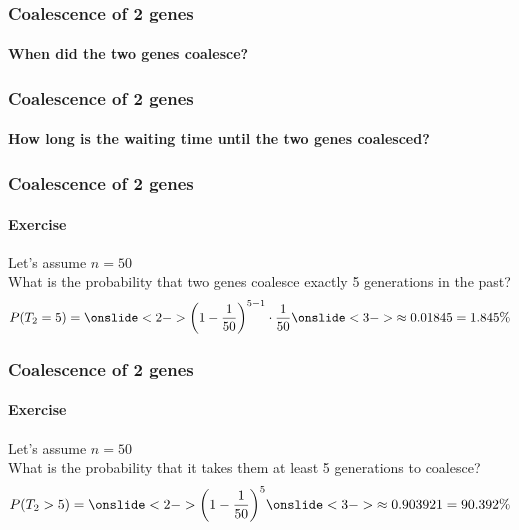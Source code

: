 \documentclass{beamer}
\begin{document}
        \begin{frame}
            \frametitle{Coalescence of 2 genes}
            \framesubtitle{When did the two genes coalesce? }
        \end{frame}

        \begin{frame}
            \frametitle{Coalescence of 2 genes}
            \framesubtitle{How long is the waiting time until the two genes coalesced?}
        \end{frame}

        \begin{frame}
            \frametitle{Coalescence of 2 genes}
            \framesubtitle{Exercise}
            Let's assume $n = 50$ \\
            What is the probability that two genes coalesce exactly 5 generations in the past? \\ 
                \[
                    P(T_{2} = 5) =
                    \onslide<2->{\left(1 - \frac{1}{50}\right)^{5-1} \cdot \frac{1}{50}}
                    \onslide<3->{\approx 0.01845 = 1.845\%}
                \]
        \end{frame}

        \begin{frame}
            \frametitle{Coalescence of 2 genes}
            \framesubtitle{Exercise}
            Let's assume $n = 50$ \\
            What is the probability that it takes them at least 5 generations to coalesce? \\ 
                \[
                    P(T_{2} > 5) =
                    \onslide<2->{\left(1 - \frac{1}{50}\right)^{5}}
                    \onslide<3->{\approx 0.903921
                    = 90.392\%}
                \]
        \end{frame}
\end{document}
